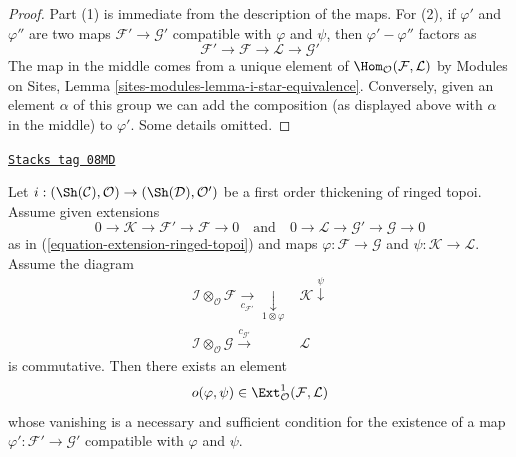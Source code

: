 \begin{proof}
Part (1) is immediate from the description of the maps.
For (2), if $\varphi'$ and $\varphi''$ are two maps
$\mathcal{F}' \to \mathcal{G}'$ compatible with $\varphi$
and $\psi$, then $\varphi' - \varphi''$ factors as
$$
\mathcal{F}' \to \mathcal{F} \to \mathcal{L} \to \mathcal{G}'
$$
The map in the middle comes from a unique element of
$\Hom_\mathcal{O}(\mathcal{F}, \mathcal{L})$ by
Modules on Sites, Lemma \ref{sites-modules-lemma-i-star-equivalence}.
Conversely, given an element $\alpha$ of this group we can add the
composition (as displayed above with $\alpha$ in the middle)
to $\varphi'$. Some details omitted.
\end{proof}

\begin{lemma}
\label{defos-lemma-inf-obs-map-ringed-topoi}
\href{https://stacks.math.columbia.edu/tag/08MD}{\texttt{Stacks tag 08MD}}

Let $i : (\Sh(\mathcal{C}), \mathcal{O}) \to (\Sh(\mathcal{D}), \mathcal{O}')$
be a first order thickening of ringed topoi. Assume given extensions
$$
0 \to \mathcal{K} \to \mathcal{F}' \to \mathcal{F} \to 0
\quad\text{and}\quad
0 \to \mathcal{L} \to \mathcal{G}' \to \mathcal{G} \to 0
$$
as in (\ref{equation-extension-ringed-topoi})
and maps $\varphi : \mathcal{F} \to \mathcal{G}$ and
$\psi : \mathcal{K} \to \mathcal{L}$. Assume the diagram
$$
\begin{array}{cc}\mathcal{I} \otimes_\mathcal{O} \mathcal{F}
\underset{c_{\mathcal{F}'}}{\longrightarrow}\underset{1 \otimes \varphi}{\downarrow} & \mathcal{K} \overset{\psi}{\downarrow} \\ \mathcal{I} \otimes_\mathcal{O} \mathcal{G}
\overset{c_{\mathcal{G}'}}{\longrightarrow} & \mathcal{L}\end{array}
$$
is commutative. Then there exists an element
$$
o(\varphi, \psi) \in
\Ext^1_\mathcal{O}(\mathcal{F}, \mathcal{L})
$$
whose vanishing is a necessary and sufficient condition for the existence
of a map $\varphi' : \mathcal{F}' \to \mathcal{G}'$ compatible with
$\varphi$ and $\psi$.
\end{lemma}

